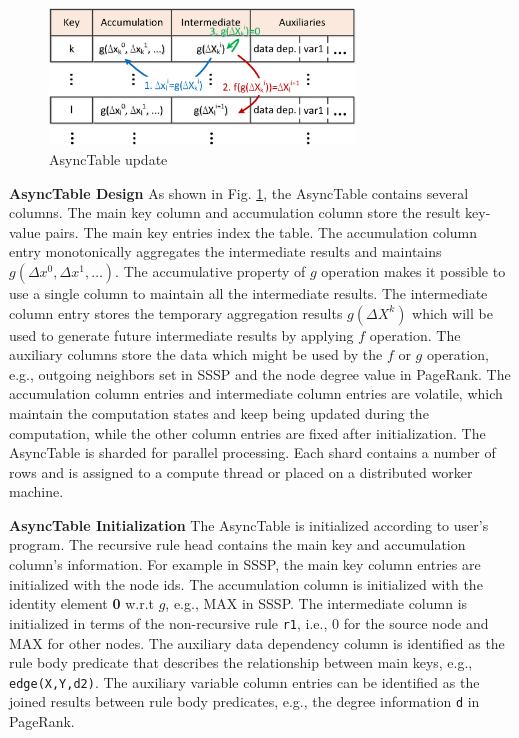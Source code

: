 \documentclass{vldb}
\begin{document}
\begin{figure}[!t]
    \centering
  \includegraphics[width=3.2in]{fig/asynctable}
  \vspace{-0.1in}
  \caption{AsyncTable update}
  \label{fig:asynctable}
  \vspace{-0.2in}
\end{figure}


\noindent\textbf{AsyncTable Design}
As shown in Fig. \ref{fig:asynctable}, the AsyncTable contains several columns. The main key column and accumulation column store the result key-value pairs. The main key entries index the table. The accumulation column entry monotonically aggregates the intermediate results and maintains $g(\Delta x^0,\Delta x^1,\ldots)$. The accumulative property of $g$ operation makes it possible to use a single column to maintain all the intermediate results. The intermediate column entry stores the temporary aggregation results $g(\Delta X^k)$ which will be used to generate future intermediate results by applying $f$ operation. The auxiliary columns store the data which might be used by the $f$ or $g$ operation, e.g., outgoing neighbors set in SSSP and the node degree value in PageRank. The accumulation column entries and intermediate column entries are volatile, which maintain the computation states and keep being updated during the computation, while the other column entries are fixed after initialization. The AsyncTable is sharded for parallel processing. Each shard contains a number of rows and is assigned to a compute thread or placed on a distributed worker machine.

\noindent\textbf{AsyncTable Initialization}
The AsyncTable is initialized according to user's program. The recursive rule head contains the main key and accumulation column's information. For example in SSSP, the main key column entries are initialized with the node ids. The accumulation column is initialized with the identity element \textbf{0} w.r.t $g$, e.g., MAX in SSSP. The intermediate column is initialized in terms of the non-recursive rule \texttt{r1}, i.e., 0 for the source node and MAX for other nodes. The auxiliary data dependency column is identified as the rule body predicate that describes the relationship between main keys, e.g., \texttt{edge(X,Y,d2)}. The auxiliary variable column entries can be identified as the joined results between rule body predicates, e.g., the degree information \texttt{d} in PageRank.
\end{document}
